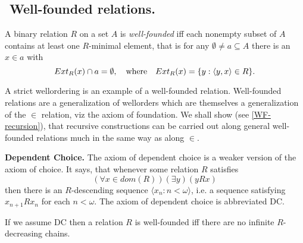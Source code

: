 \subsection{${}$ \hspace{-1em}Well-founded relations.}

\begin{definition}\label{ext}
A binary relation $R$ on a set $A$ is \emph{well-founded}
iff each nonempty subset of $A$ contains at least one
 $R$-minimal element, that is for any $\emptyset\neq a\subseteq A$ there is an $x\in a$ with
 $$ %
  Ext_R(x) \cap a = \emptyset,\quad\hbox{where}\quad Ext_R(x)=\{ y:\langle y,x\rangle\in R\}.
 $$ %
\end{definition}

A strict wellordering is an example of a well-founded relation. Well-founded relations
are a generalization of wellorders which are themselves a generalization of the $\in$
relation, viz the axiom of foundation. We shall show (see \ref{WF-recursion}), that recursive
constructions can be carried out along general well-founded relations much in the same way as along $\in$.

\begin{definition}\label{DC}
{\bf Dependent Choice.} The axiom of dependent choice is a weaker
version of the axiom of choice. It says, that
whenever some relation $R$ satisfies
$$ %
  (\forall x\in dom(R))(\exists y)(yRx)
$$ %
then there is an $R$-descending sequence $\langle x_n:n<\omega\rangle$,
i.e. a sequence satisfying $x_{n+1}R x_n$ for each $n<\omega$.
The axiom of dependent choice is abbreviated DC.
\end{definition}

\begin{fact} If we assume DC then a relation $R$ is well-founded iff there are no infinite $R$-decreasing chains.
\end{fact}




